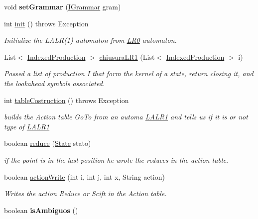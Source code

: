 \begin{DoxyCompactItemize}
\item 
\hypertarget{classcontext_free_1_1scanner_1_1_l_a_l_r1_a7db67e7e6a0c58be0de391f71165fc7c}{void {\bfseries set\-Grammar} (\hyperlink{interfacecontext_free_1_1grammar_1_1_i_grammar}{I\-Grammar} gram)}\label{classcontext_free_1_1scanner_1_1_l_a_l_r1_a7db67e7e6a0c58be0de391f71165fc7c}

\item 
int \hyperlink{classcontext_free_1_1scanner_1_1_l_a_l_r1_a84de2247841f98c9d1339acac165d141}{init} ()  throws Exception
\begin{DoxyCompactList}\small\item\em Initialize the L\-A\-L\-R(1) automaton from \hyperlink{classcontext_free_1_1scanner_1_1_l_r0}{L\-R0} automaton. \end{DoxyCompactList}\item 
List$<$ \hyperlink{classcontext_free_1_1scanner_1_1_indexed_production}{Indexed\-Production} $>$ \hyperlink{classcontext_free_1_1scanner_1_1_l_a_l_r1_a879873c5f879881494d342782387d661}{chiusura\-L\-R1} (List$<$ \hyperlink{classcontext_free_1_1scanner_1_1_indexed_production}{Indexed\-Production} $>$ i)
\begin{DoxyCompactList}\small\item\em Passed a list of production I that form the kernel of a state, return closing it, and the lookahead symbols associated. \end{DoxyCompactList}\item 
int \hyperlink{classcontext_free_1_1scanner_1_1_l_a_l_r1_a92b63b5d61bbdd523a16aa5e577c2ba6}{table\-Costruction} ()  throws Exception
\begin{DoxyCompactList}\small\item\em builds the Action table Go\-To from an automa \hyperlink{classcontext_free_1_1scanner_1_1_l_a_l_r1}{L\-A\-L\-R1} and tells us if it is or not type of \hyperlink{classcontext_free_1_1scanner_1_1_l_a_l_r1}{L\-A\-L\-R1} \end{DoxyCompactList}\item 
boolean \hyperlink{classcontext_free_1_1scanner_1_1_l_a_l_r1_a909aea9ab05f3633c169e4dd20447e62}{reduce} (\hyperlink{classcontext_free_1_1scanner_1_1_state}{State} stato)
\begin{DoxyCompactList}\small\item\em if the point is in the last position he wrote the reduces in the action table. \end{DoxyCompactList}\item 
boolean \hyperlink{classcontext_free_1_1scanner_1_1_l_a_l_r1_aee49a037861ca73f5380efb261517825}{action\-Write} (int i, int j, int x, String action)
\begin{DoxyCompactList}\small\item\em Writes the action Reduce or Scift in the Action table. \end{DoxyCompactList}\item 
\hypertarget{classcontext_free_1_1scanner_1_1_l_a_l_r1_a53759d4a64bdb55fe8c039db8eb891f3}{boolean {\bfseries is\-Ambiguos} ()}\label{classcontext_free_1_1scanner_1_1_l_a_l_r1_a53759d4a64bdb55fe8c039db8eb891f3}


\end{DoxyCompactItemize}

